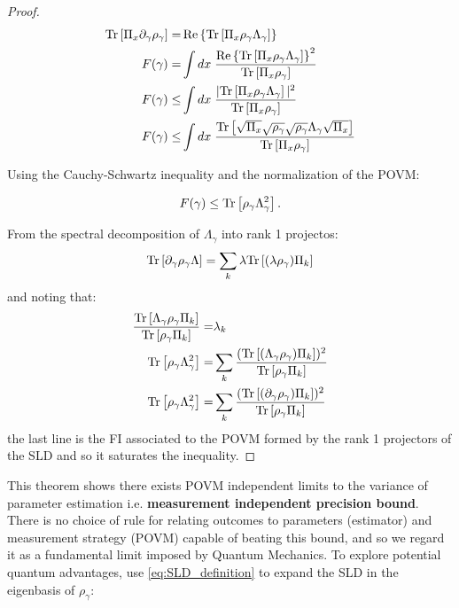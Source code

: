\begin{proof}
\begin{align}
  \mathrm{Tr}\left[\Pi_{x}\partial_{\gamma}\rho_{\gamma}\right] =& \operatorname{Re}\left\{\mathrm{Tr}\left[\Pi_{x}\rho_{\gamma}\Lambda_{\gamma}\right]\right\}\\
   F(\gamma) =& \int dx\hspace{0.1cm} \frac{\operatorname{Re}\left\{\mathrm{Tr}\left[\Pi_{x}\rho_{\gamma}\Lambda_{\gamma}\right]\right\}^{2}}{\mathrm{Tr}\left[\Pi_{x}\rho_{\gamma}\right]}\\
   F(\gamma) \leq& \int dx\hspace{0.1cm} \frac{|\mathrm{Tr}\left[\Pi_{x}\rho_{\gamma}\Lambda_{\gamma}\right]|^{2}}{\mathrm{Tr}\left[\Pi_{x}\rho_{\gamma}\right]}\\
   F(\gamma) \leq& \int dx\hspace{0.1cm} \frac{\mathrm{Tr}\left[\sqrt{\Pi_{x}}\sqrt{\rho_{\gamma}}\sqrt{\rho_{\gamma}}\Lambda_{\gamma}\sqrt{\Pi_{x}}\right]}{\mathrm{Tr}\left[\Pi_{x}\rho_{\gamma}\right]}\\
\end{align}

Using the Cauchy-Schwartz inequality and the normalization of the POVM:

\begin{equation}
F(\gamma) \leq  \mathrm{Tr}\left[\rho_{\gamma}\Lambda_{\gamma}^{2}\right].
\end{equation}

From the spectral decomposition of $\Lambda_{\gamma}$ into rank 1 projectos:
\begin{equation}
\mathrm{Tr}\left[\partial_{\gamma}\rho_{\gamma}\Lambda\right] = \sum_{k} \lambda\mathrm{Tr}\left[(\lambda\rho_{\gamma})\Pi_{k}\right]
\end{equation}
and noting that:
\begin{align}
\frac{\mathrm{Tr}\left[\Lambda_{\gamma}\rho_{\gamma}\Pi_{k}\right]}{\mathrm{Tr}\left[\rho_{\gamma}\Pi_{k}\right]} =& \lambda_{k}\\
\mathrm{Tr}\left[\rho_{\gamma}\Lambda_{\gamma}^{2}\right] =& \sum_{k} \frac{(\mathrm{Tr}\left[(\Lambda_{\gamma}\rho_{\gamma})\Pi_{k}\right])^{2}}{\mathrm{Tr}\left[\rho_{\gamma}\Pi_{k}\right]}\\
\mathrm{Tr}\left[\rho_{\gamma}\Lambda_{\gamma}^{2}\right] =&\sum_{k} \frac{(\mathrm{Tr}\left[(\partial_{\gamma}\rho_{\gamma})\Pi_{k}\right])^{2}}{\mathrm{Tr}\left[\rho_{\gamma}\Pi_{k}\right]}
\end{align}
the last line is the FI associated to the POVM formed by the rank 1 projectors of the SLD and so it saturates the inequality.
\end{proof}

This theorem shows there exists POVM independent limits to the variance of parameter estimation
i.e. \textbf{measurement independent precision bound}. There is no choice of rule for relating outcomes to parameters (estimator) and
measurement strategy (POVM) capable of beating this bound, and so we regard it as a fundamental limit imposed by Quantum Mechanics.
To explore potential quantum advantages, use \eqref{eq:SLD_definition} to expand the SLD in the eigenbasis of $\rho_{\gamma}$:

